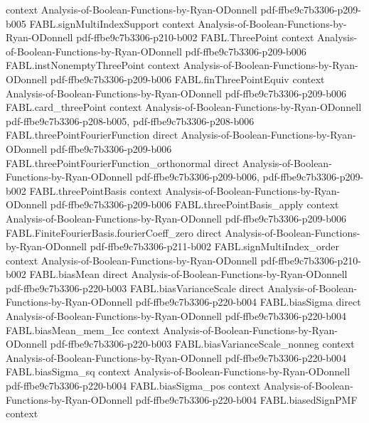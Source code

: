 \begin{theorem}
  {context}
  {Analysis-of-Boolean-Functions-by-Ryan-ODonnell}
  {pdf-ffbe9c7b3306-p209-b005}
\proofstep
  {FABL.signMultiIndexSupport}
  {context}
  {Analysis-of-Boolean-Functions-by-Ryan-ODonnell}
  {pdf-ffbe9c7b3306-p210-b002}
\proofstep
  {FABL.ThreePoint}
  {context}
  {Analysis-of-Boolean-Functions-by-Ryan-ODonnell}
  {pdf-ffbe9c7b3306-p209-b006}
\proofstep
  {FABL.instNonemptyThreePoint}
  {context}
  {Analysis-of-Boolean-Functions-by-Ryan-ODonnell}
  {pdf-ffbe9c7b3306-p209-b006}
\proofstep
  {FABL.finThreePointEquiv}
  {context}
  {Analysis-of-Boolean-Functions-by-Ryan-ODonnell}
  {pdf-ffbe9c7b3306-p209-b006}
\proofstep
  {FABL.card_threePoint}
  {context}
  {Analysis-of-Boolean-Functions-by-Ryan-ODonnell}
  {pdf-ffbe9c7b3306-p208-b005,
    pdf-ffbe9c7b3306-p208-b006}
\proofstep
  {FABL.threePointFourierFunction}
  {direct}
  {Analysis-of-Boolean-Functions-by-Ryan-ODonnell}
  {pdf-ffbe9c7b3306-p209-b006}
\proofstep
  {FABL.threePointFourierFunction_orthonormal}
  {direct}
  {Analysis-of-Boolean-Functions-by-Ryan-ODonnell}
  {pdf-ffbe9c7b3306-p209-b006,
    pdf-ffbe9c7b3306-p209-b002}
\proofstep
  {FABL.threePointBasis}
  {context}
  {Analysis-of-Boolean-Functions-by-Ryan-ODonnell}
  {pdf-ffbe9c7b3306-p209-b006}
\proofstep
  {FABL.threePointBasis_apply}
  {context}
  {Analysis-of-Boolean-Functions-by-Ryan-ODonnell}
  {pdf-ffbe9c7b3306-p209-b006}
\proofstep
  {FABL.FiniteFourierBasis.fourierCoeff_zero}
  {direct}
  {Analysis-of-Boolean-Functions-by-Ryan-ODonnell}
  {pdf-ffbe9c7b3306-p211-b002}
\proofstep
  {FABL.signMultiIndex_order}
  {context}
  {Analysis-of-Boolean-Functions-by-Ryan-ODonnell}
  {pdf-ffbe9c7b3306-p210-b002}
\proofstep
  {FABL.biasMean}
  {direct}
  {Analysis-of-Boolean-Functions-by-Ryan-ODonnell}
  {pdf-ffbe9c7b3306-p220-b003}
\proofstep
  {FABL.biasVarianceScale}
  {direct}
  {Analysis-of-Boolean-Functions-by-Ryan-ODonnell}
  {pdf-ffbe9c7b3306-p220-b004}
\proofstep
  {FABL.biasSigma}
  {direct}
  {Analysis-of-Boolean-Functions-by-Ryan-ODonnell}
  {pdf-ffbe9c7b3306-p220-b004}
\proofstep
  {FABL.biasMean_mem_Icc}
  {context}
  {Analysis-of-Boolean-Functions-by-Ryan-ODonnell}
  {pdf-ffbe9c7b3306-p220-b003}
\proofstep
  {FABL.biasVarianceScale_nonneg}
  {context}
  {Analysis-of-Boolean-Functions-by-Ryan-ODonnell}
  {pdf-ffbe9c7b3306-p220-b004}
\proofstep
  {FABL.biasSigma_sq}
  {context}
  {Analysis-of-Boolean-Functions-by-Ryan-ODonnell}
  {pdf-ffbe9c7b3306-p220-b004}
\proofstep
  {FABL.biasSigma_pos}
  {context}
  {Analysis-of-Boolean-Functions-by-Ryan-ODonnell}
  {pdf-ffbe9c7b3306-p220-b004}
\proofstep
  {FABL.biasedSignPMF}
  {context}

\end{theorem}
